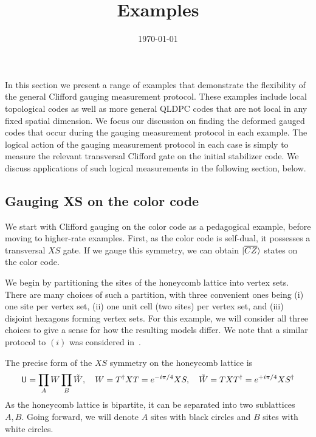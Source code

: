 \documentclass[11pt]{article}
\begin{document}
    \title{Examples}
    \date{\today}
    

    \maketitle
\fi


In this section we present a range of examples that demonstrate the flexibility of the general Clifford gauging measurement protocol. These examples include local topological codes as well as more general QLDPC codes that are not local in any fixed spatial dimension. We focus our discussion on finding the deformed gauged codes that occur during the gauging measurement protocol in each example. The logical action of the gauging measurement protocol in each case is simply to measure the relevant transversal Clifford gate on the initial stabilizer code. We discuss applications of such logical measurements in the following section, below. 

\subsection{Gauging XS on the color code}
We start with Clifford gauging on the color code as a pedagogical example, before moving to higher-rate examples. First, as the color code is self-dual, it possesses a transversal $XS$ gate. If we gauge this symmetry, we can obtain $\ket{\overline{CZ}}$ states on the color code. 

We begin by partitioning the sites of the honeycomb lattice into vertex sets. There are many choices of such a partition, with three convenient ones being (i) one site per vertex set, (ii) one unit cell (two sites) per vertex set, and (iii) disjoint hexagons forming vertex sets. For this example, we will consider all three choices to give a sense for how the resulting models differ. We note that a similar protocol to $(i)$ was considered in~\cite{Tantivasadakarn23}. 

The precise form of the $XS$ symmetry on the honeycomb lattice is \begin{equation}
    \mathsf{U} = \prod_{A} W \prod_B \tilde{W}, \quad W = T^\dagger X T = e^{-i\pi/4}XS, \quad \tilde{W} = TXT^\dagger = e^{+i\pi/4}XS^\dagger
\end{equation} As the honeycomb lattice is bipartite, it can be separated into two sublattices $A, B$. Going forward, we will denote $A$ sites with black circles and $B$ sites with white circles.
\end{document}
